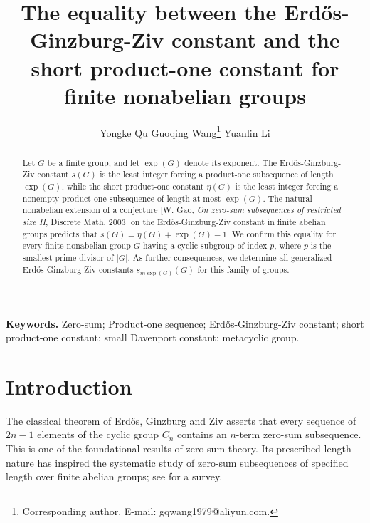 \documentclass[a4paper, 12pt]{article}
\title{The equality between the Erd\H{o}s-Ginzburg-Ziv constant and
the short product-one constant for finite nonabelian groups}
\author{
Yongke Qu
\qquad
Guoqing Wang\thanks{Corresponding author. E-mail: gqwang1979@aliyun.com.}
\qquad
Yuanlin Li}
\date{}
\theoremstyle{definition}
\begin{document}
\maketitle

\begin{abstract}

Let $G$ be a finite group, and let $\exp(G)$ denote its
exponent. The Erd\H{o}s-Ginzburg-Ziv constant $s(G)$ is the least
integer forcing a product-one subsequence of length $\exp(G)$, while
the short product-one constant $\eta(G)$ is the least integer forcing
a nonempty product-one subsequence of length at most $\exp(G)$. The
natural nonabelian extension of a conjecture [W. Gao, \emph{On zero-sum subsequences of restricted size II}, Discrete Math. 2003] on the Erd\H{o}s-Ginzburg-Ziv constant in finite abelian groups  predicts that
$s(G)=\eta(G)+\exp(G)-1.$
We confirm this equality for every finite nonabelian group $G$ having
a cyclic subgroup of index $p$, where $p$ is the smallest prime
divisor of $|G|$.  As further consequences, we determine all
generalized Erd\H{o}s-Ginzburg-Ziv constants $s_{m\exp(G)}(G)$ for this family of groups.
\end{abstract}

\noindent\textbf{Keywords.}
Zero-sum; Product-one sequence; Erd\H{o}s-Ginzburg-Ziv constant;
short product-one constant; small Davenport constant; metacyclic group.






\section{Introduction}

The classical theorem of Erd\H{o}s, Ginzburg and Ziv \cite{EGZ}
asserts that every sequence of $2n-1$ elements of the cyclic group
$C_n$ contains an $n$-term zero-sum subsequence. This is one of the
foundational results of zero-sum theory. Its prescribed-length nature
has inspired the systematic study of zero-sum subsequences of
specified length over finite abelian groups; see
\cite{GaoGeroldingersurvey} for a survey.
\end{document}
